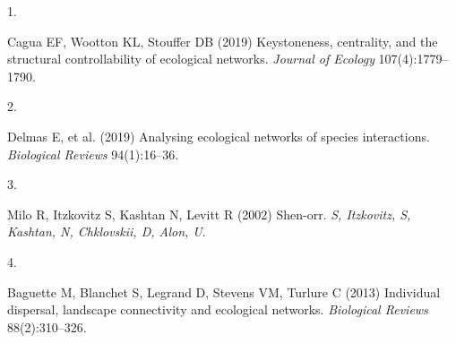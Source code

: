 \documentclass[9pt,twocolumn,twoside,]{pnas-new}
\newlength{\cslhangindent}
\newlength{\csllabelwidth}
\newlength{\cslentryspacingunit} %
\newenvironment{CSLReferences}[2] %
 {%
  \setlength{\parindent}{0pt}
  \ifodd #1
  \let\oldpar\par
  \def\par{\hangindent=\cslhangindent\oldpar}
  \fi
  \setlength{\parskip}{#2\cslentryspacingunit}
 }%
 {}
\newcommand{\CSLLeftMargin}[1]{\parbox[t]{\csllabelwidth}{#1}}
\newcommand{\CSLRightInline}[1]{\parbox[t]{\linewidth - \csllabelwidth}{#1}\break}
\begin{document}
\hypertarget{refs}{}
\begin{CSLReferences}{0}{0}
\leavevmode{}%
\CSLLeftMargin{1. }%
\CSLRightInline{Cagua EF, Wootton KL, Stouffer DB (2019) Keystoneness,
centrality, and the structural controllability of ecological networks.
\emph{Journal of Ecology} 107(4):1779--1790.}

\leavevmode{}%
\CSLLeftMargin{2. }%
\CSLRightInline{Delmas E, et al. (2019) Analysing ecological networks of
species interactions. \emph{Biological Reviews} 94(1):16--36.}

\leavevmode{}%
\CSLLeftMargin{3. }%
\CSLRightInline{Milo R, Itzkovitz S, Kashtan N, Levitt R (2002)
Shen-orr. \emph{S, Itzkovitz, S, Kashtan, N, Chklovskii, D, Alon, U}.}

\leavevmode{}%
\CSLLeftMargin{4. }%
\CSLRightInline{Baguette M, Blanchet S, Legrand D, Stevens VM, Turlure C
(2013) Individual dispersal, landscape connectivity and ecological
networks. \emph{Biological Reviews} 88(2):310--326.}

\end{CSLReferences}



% 
\end{document}
